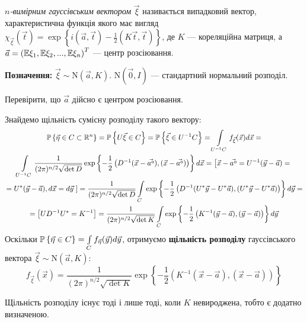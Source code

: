 \begin{definition}
    $n$\emph{-вимірним гауссівським вектором} $\vec{\xi}$ називається випадковий вектор,
    характеристична функція якого має вигляд $\chi_{\vec{\xi}}(\vec{t}) = \exp\left\{i(\vec{a}, \vec{t}) - \frac{1}{2}(K\vec{t}, \vec{t})\right\}$,
    де $K$ --- кореляційна матриця, а $\vec{a} = \left( \E\xi_1, \E\xi_2, ..., \E\xi_n\right)^T$ --- центр розсіювання.
\end{definition}
\noindent \textbf{Позначення:} $\vec{\xi} \sim \mathrm{N}( \vec{a}, K)$. $\mathrm{N}( \vec{0}, {I})$ --- стандартний нормальний розподіл.
\begin{exercise}
    Перевірити, що $\vec{a}$ дійсно є центром розсіювання.
\end{exercise}
Знайдемо щільність сумісну розподілу такого вектору:
\begin{gather*}
    \P\left\{\vec{\eta} \in C \subset \mathbb{R}^n\right\} = \P\left\{U\vec{\xi}\in C\right\} = 
    \P\left\{\vec{\xi}\in U^{-1}C\right\} = 
    \int\limits_{U^{-1}C} f_{\vec{\xi}}(\vec{x}) d\vec{x} = \\
    \int\limits_{U^{-1}C} \frac{1}{(2\pi)^{n/2} \sqrt{{\det{D}}}} \exp \left\{ -\frac{1}{2} \left( D^{-1}(\vec{x} - \vec{a^o}), (\vec{x} - \vec{a^o})\right)\right\} d\vec{x} =
    \left[ \vec{x} - \vec{a^o} = U^{-1}(\vec{y} - \vec{a}) = \right. \\ \left. = U^{*}(\vec{y} - \vec{a}), d\vec{x} = d\vec{y}\;\right] = 
    \frac{1}{(2\pi)^{n/2} \sqrt{{\det{D}}}} \int\limits_{C} \exp \left\{ -\frac{1}{2} \left( D^{-1}(U^{*}\vec{y} - U^{*}\vec{a}), (U^{*}\vec{y} - U^{*}\vec{a})\right)\right\} d\vec{y} = \\
    = \left[ UD^{-1}U^{*} = K^{-1}\right] =
    \frac{1}{(2\pi)^{n/2} \sqrt{{\det{K}}}} \int\limits_{C} \exp \left\{ -\frac{1}{2} \left( K^{-1}(\vec{y} - \vec{a}), (\vec{y} - \vec{a})\right)\right\} d\vec{y}
\end{gather*}
Оскільки $\P\left\{\vec{\eta} \in C\right\} = \int\limits_{C} f_{\vec{\eta}}(\vec{y}) d\vec{y}$,
отримуємо \textbf{щільність розподілу} гауссівського вектора $\vec{\xi} \sim \mathrm{N}(\vec{a}, K)$:
\begin{equation}
    f_{\vec{\xi}}(\vec{x}) = \frac{1}{(2\pi)^{n/2} \sqrt{{\det{K}}}} \exp \left\{ -\frac{1}{2} \left( K^{-1}(\vec{x} - \vec{a}), (\vec{x} - \vec{a})\right)\right\}
\end{equation}
\begin{remark}
    Щільність розподілу існує тоді і лише тоді, коли $K$ невироджена, тобто є додатно визначеною.
\end{remark}

